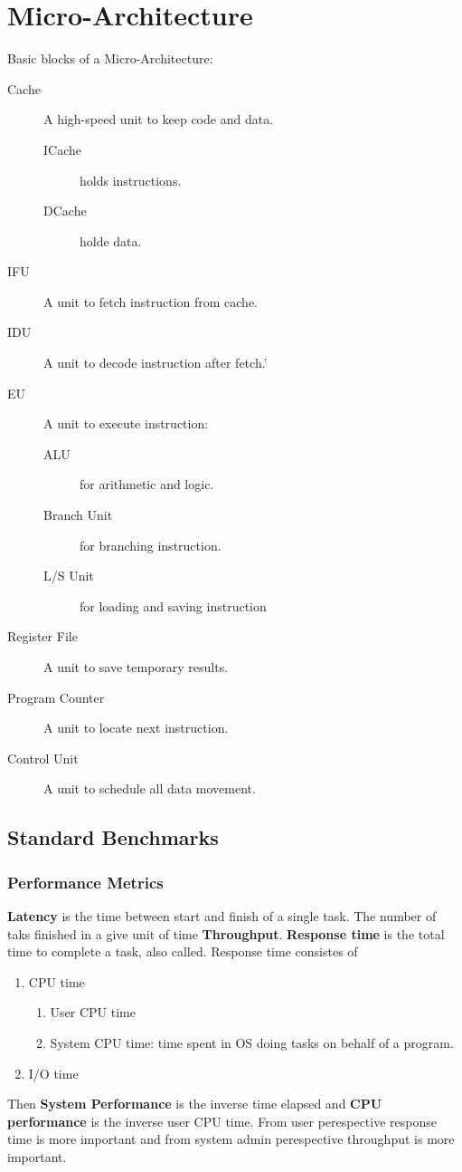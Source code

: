 \chapter{Micro-Architecture}
Basic blocks of a Micro-Architecture:
\begin{description}
    \item [Cache] A high-speed unit to keep code and data.
          \begin{description}
              \item [ICache] holds instructions.
              \item [DCache] holde data.
          \end{description}
    \item [IFU] A unit to fetch instruction from cache.
    \item [IDU] A unit to decode instruction after fetch.'
    \item [EU] A unit to execute instruction:
          \begin{description}
              \item [ALU] for arithmetic and logic.
              \item [Branch Unit] for branching instruction.
              \item [L/S Unit] for loading and saving instruction
          \end{description}
    \item [Register File] A unit to save temporary results.
    \item [Program Counter] A unit to locate next instruction.
    \item [Control Unit] A unit to schedule all data movement.
\end{description}

\section{Standard Benchmarks}
\subsection{Performance Metrics}
\textbf{Latency} is the time between start and finish of a single task. The number of taks finished in a give unit of time \textbf{Throughput}.
\textbf{Response time} is the total time to complete a task, also called.
Response time consistes of
\begin{enumerate}
    \item CPU time
          \begin{enumerate}
              \item User CPU time
              \item System CPU time: time spent in OS doing tasks on behalf of a program.
          \end{enumerate}
    \item I/O time
\end{enumerate}
Then \textbf{System Performance} is the inverse time elapsed and \textbf{CPU performance} is the inverse user CPU time. From user perespective response time is more important and from system admin perespective throughput is more important.